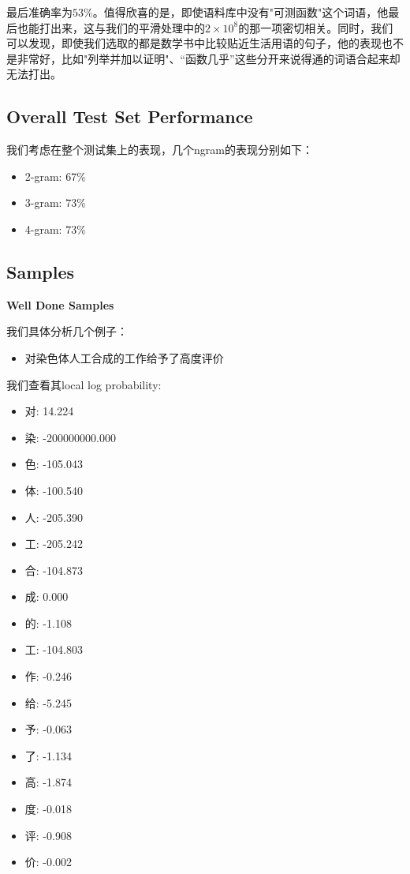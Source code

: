 \documentclass{article}
\begin{document}
最后准确率为$53\%$。值得欣喜的是，即使语料库中没有"可测函数"这个词语，他最后也能打出来，这与我们的平滑处理中的$2\times10^8$的那一项密切相关。同时，我们可以发现，即使我们选取的都是数学书中比较贴近生活用语的句子，他的表现也不是非常好，比如"列举并加以证明"、“函数几乎”这些分开来说得通的词语合起来却无法打出。

\subsection{Overall Test Set Performance}

我们考虑在整个测试集上的表现，几个ngram的表现分别如下：

\begin{itemize}
	\item 2-gram: $67\%$
	\item 3-gram: $73\%$
	\item 4-gram: $73\%$
\end{itemize}

\subsection{Samples}

\noindent \textbf{Well Done Samples}

我们具体分析几个例子：

\begin{itemize}
	\item 对染色体人工合成的工作给予了高度评价
\end{itemize}

我们查看其local log probability:

\begin{itemize}
    \item 对: 14.224
    \item 染: -200000000.000
    \item 色: -105.043
    \item 体: -100.540
    \item 人: -205.390
    \item 工: -205.242
    \item 合: -104.873
    \item 成: 0.000
    \item 的: -1.108
    \item 工: -104.803
    \item 作: -0.246
    \item 给: -5.245
    \item 予: -0.063
    \item 了: -1.134
    \item 高: -1.874
    \item 度: -0.018
    \item 评: -0.908
    \item 价: -0.002
\end{itemize}
\end{document}
